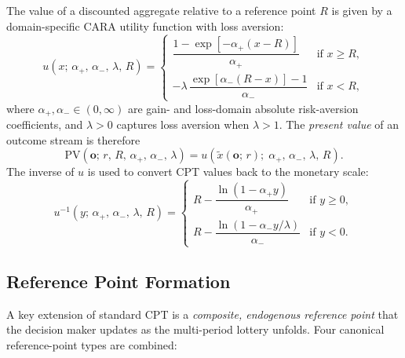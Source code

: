 \documentclass[12pt, a4paper]{article}
\begin{document}
The value of a discounted aggregate relative to a reference point $R$ is given
by a domain-specific CARA utility function with loss aversion:
\begin{equation}
  u(x;\, \alpha_+,\, \alpha_-,\, \lambda,\, R) =
  \begin{cases}
    \dfrac{1-\exp[-\alpha_+(x-R)]}{\alpha_+}
      & \text{if } x \geq R, \\[10pt]
    -\lambda\,\dfrac{\exp[\alpha_-(R-x)]-1}{\alpha_-}
      & \text{if } x < R,
  \end{cases}
  \label{eq:utility}
\end{equation}
where $\alpha_+,\alpha_- \in (0, \infty)$ are gain- and loss-domain absolute
risk-aversion coefficients, and $\lambda > 0$ captures loss aversion when
$\lambda>1$.  The
\emph{present value} of an outcome stream is therefore
\begin{equation}
  \mathrm{PV}(\mathbf{o};\, r,\, R,\, \alpha_+,\, \alpha_-,\, \lambda)
  = u\!\left(\tilde{x}(\mathbf{o};\,r);\; \alpha_+,\, \alpha_-,\, \lambda,\, R\right).
  \label{eq:pv}
\end{equation}
The inverse of $u$ is used to convert CPT values back to the monetary scale:
\begin{equation}
  u^{-1}(y;\, \alpha_+,\, \alpha_-,\, \lambda,\, R) =
  \begin{cases}
    R - \dfrac{\ln(1-\alpha_+ y)}{\alpha_+}
      & \text{if } y \geq 0, \\[10pt]
    R - \dfrac{\ln(1-\alpha_- y/\lambda)}{\alpha_-}
      & \text{if } y < 0.
  \end{cases}
  \label{eq:utility_inv}
\end{equation}

\subsection{Reference Point Formation}
\label{sec:reference}

A key extension of standard CPT is a \emph{composite, endogenous reference
point} that the decision maker updates as the multi-period lottery unfolds.
Four canonical reference-point types are combined:
\end{document}

